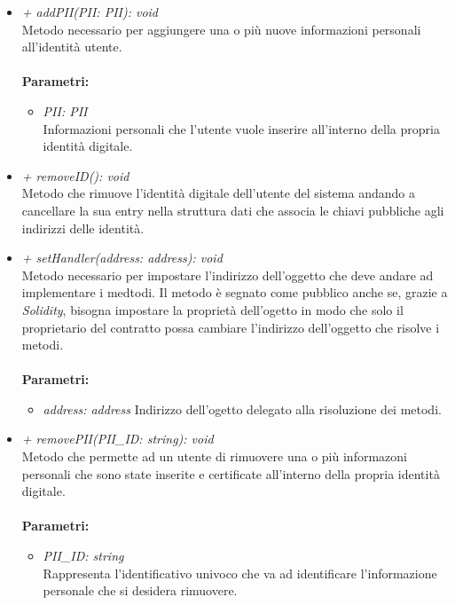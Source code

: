 \begin{itemize}
\begin{itemize}
\begin{itemize}
		\end{itemize}
		\item \textit{+ addPII(PII: PII): void}\\
		Metodo necessario per aggiungere una o più nuove informazioni personali all'identità utente.\\\\
		\textbf{Parametri:}
		\begin{itemize}
			\item \textit{PII: PII}\\
			Informazioni personali che l'utente vuole inserire all'interno della propria identità digitale.
		\end{itemize}
		\item \textit{+ removeID(): void}\\
		Metodo che rimuove l'identità digitale dell'utente del sistema andando a cancellare la sua entry nella struttura dati che associa le chiavi pubbliche agli indirizzi delle identità.
		\item \textit{+ setHandler(address: address): void}\\
		Metodo necessario per impostare l'indirizzo dell'oggetto che deve andare ad implementare i medtodi. Il metodo è segnato come pubblico anche se, grazie a \textit{Solidity}, bisogna impostare la proprietà dell'ogetto in modo che solo il proprietario del contratto possa cambiare l'indirizzo dell'oggetto che risolve i metodi.\\\\
		\textbf{Parametri:}
		\begin{itemize}
			\item \textit{address: address}
			Indirizzo dell'ogetto delegato alla risoluzione dei metodi.
		\end{itemize}
		\item \textit{+ removePII(PII\_ID: string): void}\\
		Metodo che permette ad un utente di rimuovere una o più informazoni personali che sono state inserite e certificate all'interno della propria identità digitale.\\\\
		\textbf{Parametri:}
		\begin{itemize}
			\item \textit{PII\_ID: string}\\
			Rappresenta l'identificativo univoco che va ad identificare l'informazione personale che si desidera rimuovere.
		\end{itemize}
	\end{itemize}
\end{itemize}
